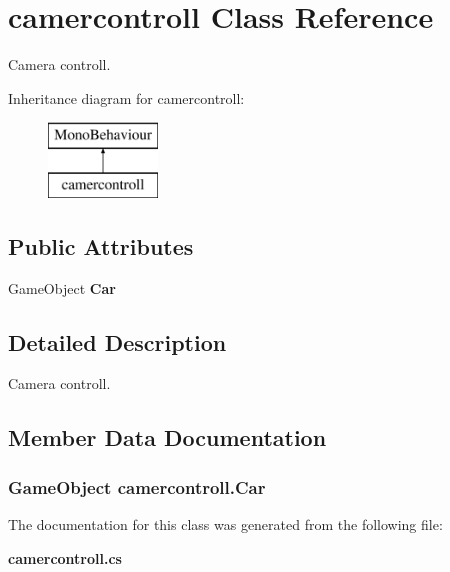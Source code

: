 \section{camercontroll Class Reference}
\label{classcamercontroll}


Camera controll.  


Inheritance diagram for camercontroll\+:\begin{figure}[H]
\begin{center}
\leavevmode
\includegraphics[height=2.000000cm]{classcamercontroll}
\end{center}
\end{figure}
\subsection*{Public Attributes}
\begin{DoxyCompactItemize}
\item 
Game\+Object {\bf Car}
\end{DoxyCompactItemize}


\subsection{Detailed Description}
Camera controll. 



\subsection{Member Data Documentation}
\subsubsection[{Car}]{\setlength{\rightskip}{0pt plus 5cm}Game\+Object camercontroll.\+Car}\label{classcamercontroll_a5d2f2bf421cdeb73400ed7a1af8bd6eb}


The documentation for this class was generated from the following file\+:\begin{DoxyCompactItemize}
\item 
{\bf camercontroll.\+cs}\end{DoxyCompactItemize}
